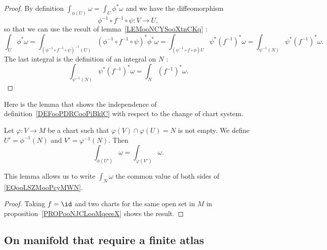 \begin{proof}
    By definition \( \int_{\phi(U)}\omega=\int_U\phi^*\omega\) and we have the diffeomorphism
    \begin{equation}
        \phi^{-1}\circ f^{-1}\circ \psi\colon V\to U,
    \end{equation}
    so that we can use the result of lemma~\ref{LEMooNCYSooXtnCKq} :
    \begin{equation}
        \int_U\phi^*\omega=\int_{(\phi^{-1}\circ f^{-1}\circ \psi)^{-1}(U)}  (\phi^{-1}\circ f^{-1}\circ \psi)^*\phi^*\omega=\int_{(\psi^{-1}\circ f\circ \phi )U}\psi^*(f^{-1})^*\omega=\int_{\psi^{-1}(N)}\psi^*(f^{-1})^*\omega.
    \end{equation}
    The last integral is the definition of an integral on \( N\) :
    \begin{equation}
        \int_{\psi^{-1}(N)}\psi^*(f^{-1})^*\omega=\int_N(f^{-1})^*\omega.
    \end{equation}
\end{proof}

Here is the lemma that shows the independence of definition~\ref{DEFooPDRCooPiBklC} with respect to the change of chart system.
\begin{lemma}
    Let \( \varphi\colon V\to M\) be a chart such that \( \varphi(V)\cap \varphi(U)=N\) is not empty. We define \( U'=\phi^{-1}(N)\) and \( V'=\varphi^{-1}(N)\). Then
    \begin{equation}        \label{EQooLSZMooPcyMWN}
        \int_{\phi(U')}\omega=\int_{\varphi(V')}\omega.
    \end{equation}
\end{lemma}
This lemma allows us to write \( \int_N\omega\) the common value of both sides of \eqref{EQooLSZMooPcyMWN}.

\begin{proof}
    Taking \( f=\id\) and two charts for the same open set in \( M\) in proposition~\ref{PROPooNJCLooMqeeeX} shows the result.
\end{proof}

\subsection{On manifold that require a finite atlas}

